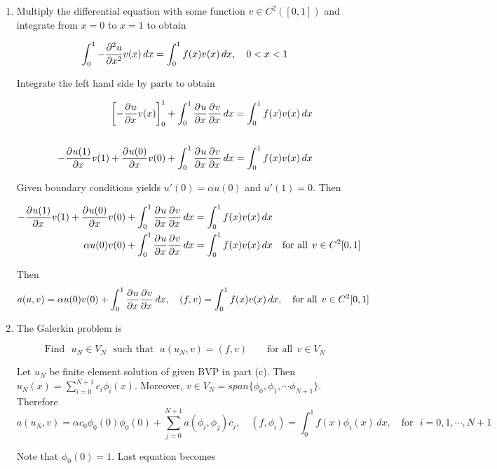 {\begin{solution}
\begin{enumerate}
\item  Multiply the differential equation with some function $v \in C^2([0,1])$ and integrate from $x = 0$
to $x = 1$ to obtain

\begin{align*}
\int_0^1 -\frac{\partial^{2} u}{\partial x^{2}} v(x) \, dx  &= \int_0^1 f(x) v(x) \, dx, \quad 0 < x < 1\\
\end{align*}

Integrate the left hand side by parts to obtain

\begin{align*}
\left[ -\frac{\partial^{} u}{\partial x^{}} v(x)\right]_0^1 + \int_0^1 \frac{\partial^{} u}{\partial x^{}} \frac{\partial^{} v}{\partial x^{}} \, dx  &= \int_0^1 f(x) v(x) \, dx\\
\\
- \frac{\partial^{} u(1)}{\partial x^{}} v(1) + \frac{\partial^{} u(0)}{\partial x^{}} v(0) + \int_0^1 \frac{\partial^{} u}{\partial x^{}} \frac{\partial^{} v}{\partial x^{}} \, dx  &= \int_0^1 f(x) v(x) \, dx \\
\end{align*} 
 
Given boundary conditions yields $u'(0) = \alpha u(0)$ and $u'(1) = 0$. Then 

\begin{align*}
- \frac{\partial^{} u(1)}{\partial x^{}} v(1) + \frac{\partial^{} u(0)}{\partial x^{}} v(0) + \int_0^1 \frac{\partial^{} u}{\partial x^{}} \frac{\partial^{} v}{\partial x^{}} \, dx  &= \int_0^1 f(x) v(x) \, dx \\
 \alpha u(0) v(0) + \int_0^1 \frac{\partial^{} u}{\partial x^{}} \frac{\partial^{} v}{\partial x^{}} \, dx  &= \int_0^1 f(x) v(x) \, dx \quad \mbox{for all} \:\: v\in C^2[0,1]\\
\end{align*} 

Then 
\[
a(u,v) = \alpha u(0) v(0) + \int_0^1 \frac{\partial^{} u}{\partial x^{}} \frac{\partial^{} v}{\partial x^{}} \, dx,   \quad (f,v)= \int_0^1 f(x) v(x) \, dx, \quad \mbox{for all} \:\: v\in C^2[0,1]
\]

\item The Galerkin problem is

\[
\mbox{Find} \:\:\: u_N\in V_N \:\:\:\mbox{such that}\:\:\: a(u_N, v) = (f,v) \qquad \mbox{for all} \:\: v\in V_N 
\] 

Let $u_N$ be finite element solution of given BVP in part (c). Then $u_N(x)= \sum_{i=0}^{N+1} c_i \phi_i(x)$. Moreover,  $v \in V_N= span\{\phi_0, \phi_1, \cdots \phi_{N+1}\}$. Therefore
\[
a(u_N, v)= \alpha c_0 \phi_0(0) \phi_0(0) +  \sum_{j=0}^{N+1} a(\phi_i, \phi_j) c_j , \quad (f, \phi_i)= \int_0^1 f(x) \phi_i(x) \, dx, \quad \mbox{for} \:\:\: i=0, 1, \cdots, N+1
\]

Note that $\phi_0(0)=1$. Last equation becomes


\end{enumerate}
\end{solution}}
